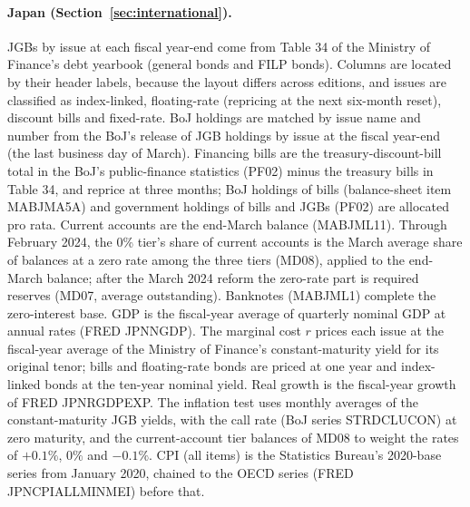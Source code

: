 \paragraph{Japan (Section~\ref{sec:international}).} JGBs by issue at each fiscal year-end come from Table 34 of the Ministry of Finance's debt yearbook (general bonds and FILP bonds). Columns are located by their header labels, because the layout differs across editions, and issues are classified as index-linked, floating-rate (repricing at the next six-month reset), discount bills and fixed-rate. BoJ holdings are matched by issue name and number from the BoJ's release of JGB holdings by issue at the fiscal year-end (the last business day of March). Financing bills are the treasury-discount-bill total in the BoJ's public-finance statistics (PF02) minus the treasury bills in Table 34, and reprice at three months; BoJ holdings of bills (balance-sheet item MABJMA5A) and government holdings of bills and JGBs (PF02) are allocated pro rata. Current accounts are the end-March balance (MABJML11). Through February 2024, the 0\% tier's share of current accounts is the March average share of balances at a zero rate among the three tiers (MD08), applied to the end-March balance; after the March 2024 reform the zero-rate part is required reserves (MD07, average outstanding). Banknotes (MABJML1) complete the zero-interest base. GDP is the fiscal-year average of quarterly nominal GDP at annual rates (FRED JPNNGDP). The marginal cost $r$ prices each issue at the fiscal-year average of the Ministry of Finance's constant-maturity yield for its original tenor; bills and floating-rate bonds are priced at one year and index-linked bonds at the ten-year nominal yield. Real growth is the fiscal-year growth of FRED JPNRGDPEXP. The inflation test uses monthly averages of the constant-maturity JGB yields, with the call rate (BoJ series STRDCLUCON) at zero maturity, and the current-account tier balances of MD08 to weight the rates of $+0.1\%$, $0\%$ and $-0.1\%$. CPI (all items) is the Statistics Bureau's 2020-base series from January 2020, chained to the OECD series (FRED JPNCPIALLMINMEI) before that.
